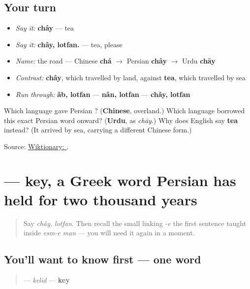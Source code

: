 \subsection*{Your turn}
\begin{itemize}
\raggedright
  \item \emph{Say it:} \textbf{chây} — tea
  \item \emph{Say it:} \textbf{chây, lotfan.} — tea, please
  \item \emph{Name:} the road — Chinese \textbf{chá} $\to$ Persian \textbf{chây} $\to$ Urdu \textbf{chāy}
  \item \emph{Contrast:} \textbf{chây}, which travelled by land, against \textbf{tea}, which travelled by sea
  \item \emph{Run through:} \textbf{âb, lotfan} — \textbf{nân, lotfan} — \textbf{chây, lotfan}
\end{itemize}

\begin{tcolorbox}[breakable,colback=teal!4,colframe=teal!35!black,title={Before you move on}]
Which language gave Persian \textbf{}? (\textbf{Chinese}, overland.) Which language borrowed this exact Persian word onward? (\textbf{Urdu}, as \emph{chāy}.) Why does English say \textbf{tea} instead? (It arrived by sea, carrying a different Chinese form.)

Source: \href{https://en.wiktionary.org/wiki/\%DA\%86\%D8\%A7\%DB\%8C}{Wiktionary: }.
\end{tcolorbox}
\section[\texorpdfstring{\fa{کلید} (kelid)}{کلید (kelid)}]{ — key, a Greek word Persian has held for two thousand years}

\label{lesson:FA-C09-kelid}



\begin{quote}
Say \emph{chây, lotfan}. Then recall the small linking \emph{-e} the first sentence taught inside \emph{esm-e man} — you will need it again in a moment.
\end{quote}

\subsection*{You'll want to know first — one word}
\begin{quote}
\textbf{} — \emph{kelid} — \textbf{key}
\end{quote}

